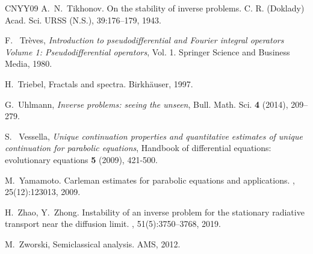 \documentclass[12pt,twoside]{amsart}
\numberwithin{equation}{section}
\begin{document}
\begin{thebibliography}{CNYY09}
A.\ N.\ Tikhonov. On the stability of inverse problems. C. R. (Doklady) Acad. Sci. URSS (N.S.), 39:176--179, 1943.

F. \ Tr{\`e}ves, \textit{{Introduction to pseudodifferential and Fourier integral operators Volume 1: Pseudodifferential operators}}, Vol. 1. Springer Science and Business Media, 1980.

H.\ Triebel, Fractals and spectra. Birkh\"auser, 1997.

G.\ Uhlmann, \textit{{Inverse problems: seeing the unseen}}, Bull. Math. Sci. {\bf 4} (2014), 209--279.

S. \ Vessella, \textit{{Unique continuation properties and quantitative estimates of unique continuation for parabolic equations}}, Handbook of differential equations: evolutionary equations {\bf 5} (2009), 421-500.


M.\ Yamamoto.
\newblock Carleman estimates for parabolic equations and applications.
, 25(12):123013, 2009.

H.\ Zhao, Y.\ Zhong.
\newblock Instability of an inverse problem for the stationary radiative
  transport near the diffusion limit.
, 51(5):3750--3768, 2019.


M.\ Zworski, Semiclassical analysis. AMS, 2012.




\end{thebibliography}
\end{document}

